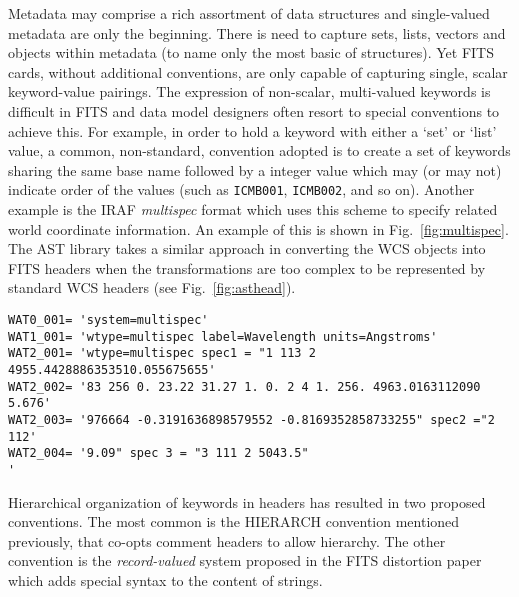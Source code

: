 \documentclass[final,authoryear,5p,times,twocolumn]{elsarticle}
\begin{document}
Metadata may comprise a rich assortment of data structures and
single-valued metadata are only the beginning. There is need to
capture sets, lists, vectors and objects within metadata (to name only
the most basic of structures). Yet FITS cards, without additional
conventions, are only capable of capturing single, scalar
keyword-value pairings. The expression of non-scalar, multi-valued
keywords is difficult in FITS and data model designers often resort to
special conventions to achieve this. For example, in order to hold a
keyword with either a `set' or `list' value, a common, non-standard,
convention adopted is to create a set of keywords sharing the same
base name followed by a integer value which may (or may not) indicate
order of the values (such as \texttt{ICMB001}, \texttt{ICMB002}, and
so on). Another example is the IRAF \textit{multispec} format
\citep[see][and references therein]{1993ASPC...52..467V} which uses
this scheme to specify related world coordinate information. An
example of this is shown in Fig.\ \ref{fig:multispec}. The AST library
\citep[][and see also \S\ref{sec:wcs}]{1998ASPC..145...41W} takes a
similar approach in converting the WCS objects into FITS headers when
the transformations are too complex to be represented by standard WCS
headers (see Fig.\ \ref{fig:asthead}).

\begin{figure*}
\begin{minipage}{\textwidth}
\begin{center}
\begin{verbatim}
WAT0_001= 'system=multispec'
WAT1_001= 'wtype=multispec label=Wavelength units=Angstroms'
WAT2_001= 'wtype=multispec spec1 = "1 113 2 4955.4428886353510.055675655'
WAT2_002= '83 256 0. 23.22 31.27 1. 0. 2 4 1. 256. 4963.0163112090 5.676'
WAT2_003= '976664 -0.3191636898579552 -0.8169352858733255" spec2 ="2 112'
WAT2_004= '9.09" spec 3 = "3 111 2 5043.5"                              '
\end{verbatim}
\end{center}
\caption{Example header from an IRAF \textit{multispec} data set
  indicating the use of multi-line headers..}
\label{fig:multispec}
\end{minipage}
\end{figure*}

Hierarchical organization of keywords in headers has resulted in two
proposed conventions. The most common is the HIERARCH convention
mentioned previously, that co-opts comment headers to allow
hierarchy. The other convention is the \emph{record-valued} system
proposed in the FITS distortion paper \citep{FITSDistort} which
adds special syntax to the content of strings.
\end{document}
